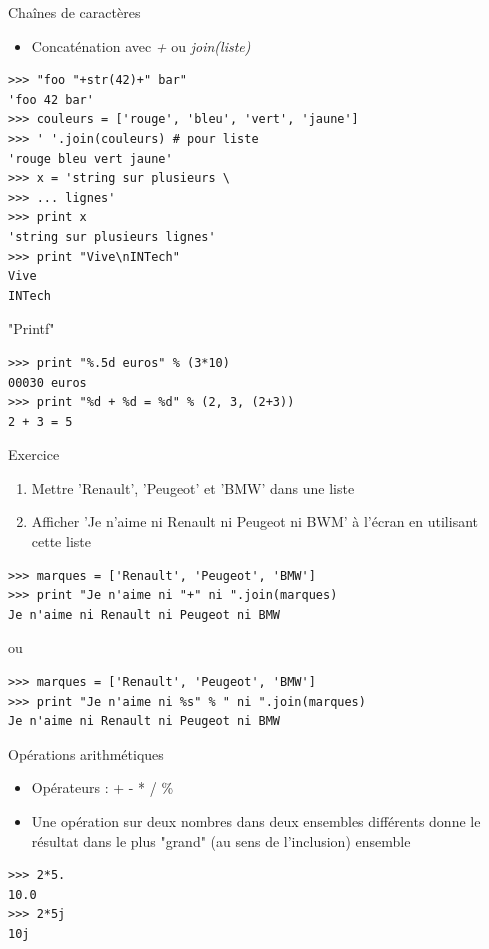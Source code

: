 \documentclass{beamer}
\begin{document}
\begin{frame}[fragile]{Chaînes de caractères}
\begin{itemize}
 \item Concaténation avec \textit{+} ou \textit{join(liste)}
\end{itemize}

\begin{lstlisting}
>>> "foo "+str(42)+" bar"
'foo 42 bar'
>>> couleurs = ['rouge', 'bleu', 'vert', 'jaune']
>>> ' '.join(couleurs) # pour liste
'rouge bleu vert jaune'
>>> x = 'string sur plusieurs \
>>> ... lignes'
>>> print x
'string sur plusieurs lignes'
>>> print "Vive\nINTech"
Vive
INTech
\end{lstlisting}
\end{frame}

\begin{frame}[fragile]{"Printf"}
\begin{lstlisting}
>>> print "%.5d euros" % (3*10)
00030 euros
>>> print "%d + %d = %d" % (2, 3, (2+3))
2 + 3 = 5
\end{lstlisting}

\end{frame}

\begin{frame}[fragile]{Exercice}
\begin{enumerate}
 \item Mettre 'Renault', 'Peugeot' et 'BMW' dans une liste
 \item Afficher 'Je n'aime ni Renault ni Peugeot ni BWM' à l'écran en utilisant cette liste
\end{enumerate}\pause

\begin{lstlisting}
>>> marques = ['Renault', 'Peugeot', 'BMW']
>>> print "Je n'aime ni "+" ni ".join(marques)
Je n'aime ni Renault ni Peugeot ni BMW
\end{lstlisting}\pause

ou 

\begin{lstlisting}
>>> marques = ['Renault', 'Peugeot', 'BMW']
>>> print "Je n'aime ni %s" % " ni ".join(marques)
Je n'aime ni Renault ni Peugeot ni BMW
\end{lstlisting}
\end{frame}

\begin{frame}[fragile]{Opérations arithmétiques}
\begin{itemize}
 \item Opérateurs : + - * / \%
 \item Une opération sur deux nombres dans deux ensembles différents donne le résultat dans le plus "grand" (au sens de l'inclusion) ensemble
\end{itemize}

\begin{lstlisting}
>>> 2*5.
10.0
>>> 2*5j
10j
\end{lstlisting}

\end{frame}
\end{document}
